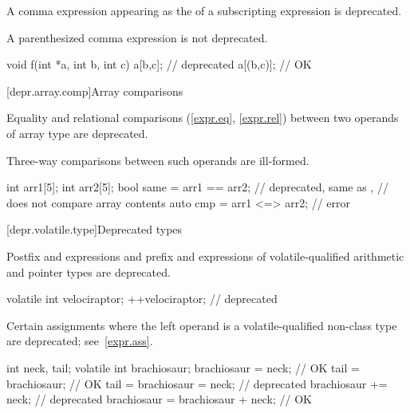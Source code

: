 \pnum
A comma expression
appearing as the 
of a subscripting expression is deprecated.
\begin{note}
A parenthesized comma expression is not deprecated.
\end{note}
\begin{example}
\begin{codeblock}
void f(int *a, int b, int c) {
    a[b,c];                     // deprecated
    a[(b,c)];                   // OK
}
\end{codeblock}
\end{example}

[depr.array.comp]{Array comparisons}

\pnum
Equality and relational comparisons (\ref{expr.eq}, \ref{expr.rel})
between two operands of array type
are deprecated.
\begin{note}
Three-way comparisons between such operands are ill-formed.
\end{note}
\begin{example}
\begin{codeblock}
int arr1[5];
int arr2[5];
bool same = arr1 == arr2;       // deprecated, same as ,
                                // does not compare array contents
auto cmp = arr1 <=> arr2;       // error
\end{codeblock}
\end{example}

[depr.volatile.type]{Deprecated  types}

\pnum
Postfix \tcode{++} and \tcode{\dcr} expressions and
prefix \tcode{++} and \tcode{\dcr} expressions
of volatile-qualified arithmetic and pointer types are deprecated.

\begin{example}
\begin{codeblock}
volatile int velociraptor;
++velociraptor;                     // deprecated
\end{codeblock}
\end{example}


\pnum
Certain assignments
where the left operand is a volatile-qualified non-class type
are deprecated; see~\ref{expr.ass}.

\begin{example}
\begin{codeblock}
int neck, tail;
volatile int brachiosaur;
brachiosaur = neck;                 // OK
tail = brachiosaur;                 // OK
tail = brachiosaur = neck;          // deprecated
brachiosaur += neck;                // deprecated
brachiosaur = brachiosaur + neck;   // OK
\end{codeblock}
\end{example}


